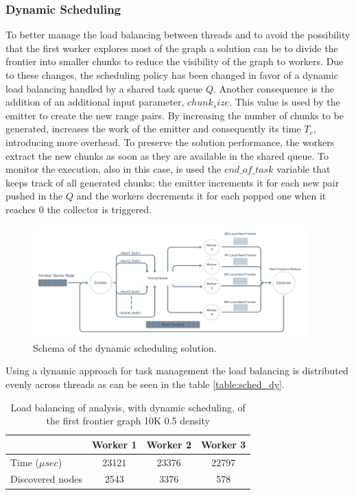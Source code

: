 \subsubsection{Dynamic Scheduling}
To better manage the load balancing between threads and to avoid the possibility that the first worker explores most of the graph a solution can be to divide the frontier into smaller chunks to reduce the visibility of the graph to workers. Due to these changes, the scheduling policy has been changed in favor of a dynamic load balancing handled by a shared task queue $Q$. Another consequence is the addition of an additional input parameter, $chunk_size$. This value is used by the emitter to create the new range pairs. By increasing the number of chunks to be generated, increases the work of the emitter and consequently its time $T_e$, introducing more overhead. To preserve the solution performance, the workers extract the new chunks as soon as they are available in the shared queue.
To monitor the execution, also in this case, is used the $end\_of\_task$ variable that keeps track of all generated chunks: the emitter increments it for each new pair pushed in the $Q$ and the workers decrements it for each popped one when it reaches $0$ the collector is triggered.


\begin{figure}[htb!]
    \centering
    \includegraphics[width=0.95\textwidth]{Figures/par_dy.png}
    \caption{Schema of the dynamic scheduling solution.}
    \label{fig:bfs_par_2_schema}
\end{figure}
\FloatBarrier

Using a dynamic approach for task management the load balancing is distributed evenly across threads as can be seen in the table \ref{table:sched_dy}.
\label{table:sched_dy}
\begin{table}[htb!]
\centering
\begin{tabular}{l|c|c|c|}
\cline{2-4}
\multicolumn{1}{c|}{}                  & Worker 1 & Worker 2 & Worker 3 \\ \hline
\multicolumn{1}{|l|}{Time ($\mu sec$)}             & 23121    & 23376    & 22797    \\ \hline
\multicolumn{1}{|l|}{Discovered nodes} & 2543     & 3376     & 578      \\ \hline
\end{tabular}
\caption{Load balancing of analysis, with dynamic scheduling, of the first frontier graph 10K 0.5 density}
\end{table}

